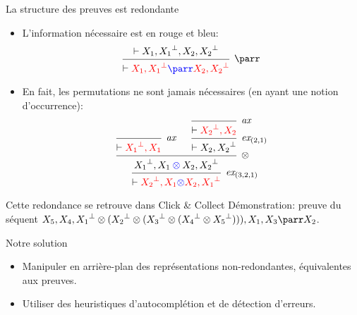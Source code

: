 \documentclass{beamer}
\newcommand*{\orth}{^\perp}
\newcommand*{\tensor}{\otimes}
\newcommand*{\hypv}[1]{\hypo{\vdash #1}}
\newcommand*{\axv}[1]{\infer{0}[\ensuremath{\mathit{ax}}]{\vdash #1}}
\newcommand*{\permv}[2]{\infer{1}[\ensuremath{\textit{ex}_{#1}}]{\vdash #2}}
\newcommand*{\foblig}[1]{\textcolor{red}{#1}}
\begin{document}
\begin{frame}{La structure des preuves est redondante}
    \begin{itemize}
        \item L'information nécessaire est en rouge et bleu:
            \begin{equation*}
            \begin{prooftree}
                \hypv{X_1, {X_1}\orth, X_2, {X_2}\orth}
                {\infer{1}[{\ensuremath{\parr}}]{\vdash \textcolor{red}{X_1, {X_1}\orth} \textcolor{blue}{\parr} \textcolor{red}{X_2, {X_2}\orth}}}
            \end{prooftree}
            \end{equation*}
            \pause
        \item En fait, les permutations ne sont jamais nécessaires (en ayant une notion d'occurrence):
            \begin{equation*}
                \begin{prooftree}
                    \axv{\foblig{{X_1}\orth, X_1}}
                    \axv{\foblig{{X_2}\orth, X_2}}
                    \permv{(2, 1)}{X_2, {X_2}\orth}
                    {\infer{2}[{\ensuremath{\tensor}}]{{X_1}\orth, X_1 \mathbin{\textcolor{blue}{\tensor}} X_2, {X_2}\orth}}
                    \permv{(3, 2, 1)}{\foblig{{X_2}\orth, X_1 \textcolor{blue}{\tensor} X_2, {X_1}\orth}}
                \end{prooftree}
            \end{equation*}
    \end{itemize}
\end{frame}

\begin{frame}{Cette redondance se retrouve dans Click \& Collect}
    Démonstration: preuve du séquent $X_5, X_4, {X_1}\orth \tensor ({X_2}\orth \tensor ({X_3}\orth \tensor ({X_4}\orth \tensor {X_5}\orth))), X_1, X_3 \parr X_2$.
\end{frame}

\begin{frame}{Notre solution}
    \begin{itemize}
        \item Manipuler en arrière-plan des représentations non-redondantes, équivalentes aux preuves.
        \item Utiliser des heuristiques d'autocomplétion et de détection d'erreurs.
     \end{itemize}
\end{frame}
\end{document}
